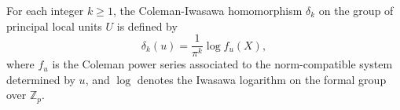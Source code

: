 For each integer $k \ge 1$, the Coleman-Iwasawa homomorphism $\delta_k$ on the group of principal local units $U$ is defined by
$$\delta_k(u) = \frac{1}{\pi^k} \log f_u(X),$$
where $f_u$ is the Coleman power series associated to the norm-compatible system determined by $u$, and $\log$ denotes the Iwasawa logarithm on the formal group over $\mathbb{Z}_p$.
